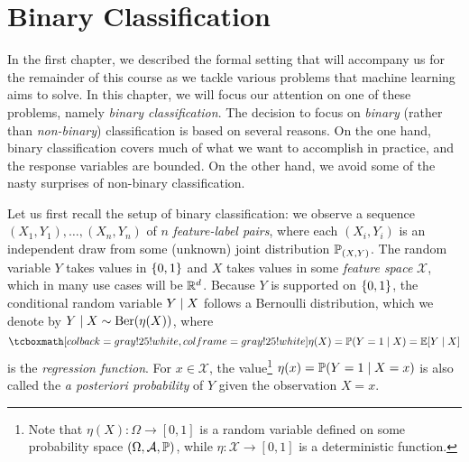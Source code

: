 \chapter{Binary Classification}
\label{ch: binary classification}

In the first chapter, we described the formal setting that will accompany us for the remainder of this course as we tackle various problems that machine learning aims to solve. In this chapter, we will focus our attention on one of these problems, namely \emph{binary classification}. The decision to focus on \emph{binary} (rather than \emph{non-binary}) classification is based on several reasons. On the one hand, binary classification covers much of what we want to accomplish in practice, and the response variables are bounded. On the other hand, we avoid some of the nasty surprises of non-binary classification.

Let us first recall the setup of binary classification: we observe a sequence $(X_1, Y_1), \dots, (X_n, Y_n)$ of $n$ \emph{feature-label pairs}, where each $(X_i, Y_i)$ is an independent draw from some (unknown) joint distribution $\P_{(X, Y)}$. The random variable $Y$ takes values in $\set{0, 1}$ and $X$ takes values in some \emph{feature space} $\mathcal{X}$, which in many use cases will be $\R^d$. Because $Y$ is supported on $\set{0, 1}$, the conditional random variable $Y \given X$ follows a Bernoulli distribution, which we denote by $Y \given X \sim \Ber(\eta(X))$, where
\[
    \highlightMath{
        \eta(X) = \Prob(Y = 1 \given X) = \Exp[Y \given X]
    }
\]
is the \emph{regression function}. For $x \in \mathcal{X}$, the value\footnote{Note that $\eta(X) \colon \Omega \to [0, 1]$ is a random variable defined on some probability space $(\Omega, \mathcal{A}, \P)$, while $\eta \colon \mathcal{X} \to [0, 1]$ is a deterministic function.} $\eta(x) = \Prob(Y = 1 \given X = x)$ is also called the \emph{a posteriori probability} of $Y$ given the observation $X = x$.
